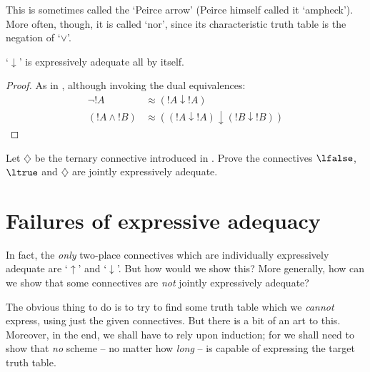 \documentclass[../../../include/open-logic-section]{subfiles}
\begin{document}
This is sometimes called the `Peirce arrow' (Peirce himself called it `ampheck'). More often, though, it is called `nor', since its characteristic truth table is the negation of `$\lor$'.
	\begin{prop}
	`$\downarrow$' is expressively adequate all by itself. 
	\begin{proof}
	As in , although invoking the dual equivalences:
		\begin{align*}
			\lnot {!A} &\approx ({!A} \downarrow {!A})\\
			({!A} \land {!B}) & \approx (({!A} \downarrow {!A}) \downarrow ({!B} \downarrow {!B}))
		\end{align*}
	\end{proof}
\end{prop}

\begin{prob}
Let \( \diamondsuit \) be the ternary connective introduced in .
Prove the connectives \( \lfalse \), \( \ltrue \) and \( \diamondsuit \) are jointly expressively adequate.
\end{prob}

\section{Failures of expressive adequacy}
 In fact, the \emph{only} two-place connectives which are individually expressively adequate are `$\uparrow$' and `$\downarrow$'. But how would we show this? More generally, how can we show that some connectives are \emph{not} jointly expressively adequate? 
 
The obvious thing to do is to try to find some truth table which we \emph{cannot} express, using just the given connectives. But there is a bit of an art to this. Moreover, in the end, we shall have to rely upon induction; for we shall need to show that \emph{no} scheme -- no matter how \emph{long} -- is capable of expressing the target truth table. 
 
\end{document}

